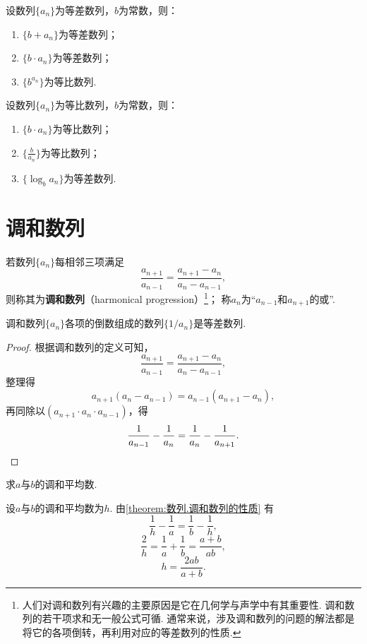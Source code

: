 \begin{property}
设数列\(\{a_n\}\)为等差数列，\(b\)为常数，则：
\begin{enumerate}
\item \(\{b + a_n\}\)为等差数列；
\item \(\{b \cdot a_n\}\)为等差数列；
\item \(\{b^{a_n}\}\)为等比数列.
\end{enumerate}
\end{property}

\begin{property}
设数列\(\{a_n\}\)为等比数列，\(b\)为常数，则：
\begin{enumerate}
\item \(\{b \cdot a_n\}\)为等比数列；
\item \(\{\frac{b}{a_n}\}\)为等比数列；
\item \(\{\log_b a_n\}\)为等差数列.
\end{enumerate}
\end{property}

\section{调和数列}
若数列\(\{a_n\}\)每相邻三项满足\[
    \frac{a_{n+1}}{a_{n-1}}
    = \frac{a_{n+1}-a_n}{a_n-a_{n-1}},
\]
则称其为\textbf{调和数列}（harmonical progression）\footnote{%
人们对调和数列有兴趣的主要原因是它在几何学与声学中有其重要性.
调和数列的若干项求和无一般公式可循.
通常来说，涉及调和数列的问题的解法都是将它的各项倒转，再利用对应的等差数列的性质.
}；
称\(a_n\)为“\(a_{n-1}\)和\(a_{n+1}\)的或”.

\begin{property}\label{theorem:数列.调和数列的性质}
调和数列\(\{a_n\}\)各项的倒数组成的数列\(\{1/a_n\}\)是等差数列.
\begin{proof}
根据调和数列的定义可知，\[
    \frac{a_{n+1}}{a_{n-1}}
    = \frac{a_{n+1}-a_n}{a_n-a_{n-1}},
\]整理得\[
    a_{n+1} (a_n - a_{n-1})
    = a_{n-1} (a_{n+1} - a_n),
\]再同除以\((a_{n+1} \cdot a_n \cdot a_{n-1})\)，得\[
    \frac{1}{a_{n-1}} - \frac{1}{a_n}
    = \frac{1}{a_n} - \frac{1}{a_{n+1}}.
    \qedhere
\]
\end{proof}
\end{property}

\begin{example}
求\(a\)与\(b\)的调和平均数.
\begin{solution}
设\(a\)与\(b\)的调和平均数为\(h\).
由\cref{theorem:数列.调和数列的性质} 有\[
    \frac{1}{h} - \frac{1}{a}
    = \frac{1}{b} - \frac{1}{h},
\]\[
    \frac{2}{h} = \frac{1}{a} + \frac{1}{b}
    = \frac{a+b}{ab},
\]\[
    h = \frac{2ab}{a+b}.
\]
\end{solution}
\end{example}


